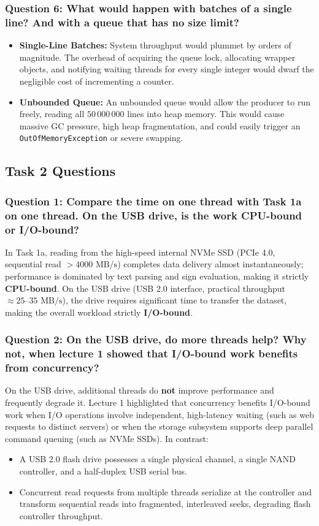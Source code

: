 \documentclass[12pt,a4paper]{article}
\begin{document}
\subsubsection{Question 6: What would happen with batches of a single line? And with a queue that has no size limit?}
\begin{itemize}
    \item \textbf{Single-Line Batches:} System throughput would plummet by orders of magnitude. The overhead of acquiring the queue lock, allocating wrapper objects, and notifying waiting threads for every single integer would dwarf the negligible cost of incrementing a counter.
    \item \textbf{Unbounded Queue:} An unbounded queue would allow the producer to run freely, reading all $50\,000\,000$ lines into heap memory. This would cause massive GC pressure, high heap fragmentation, and could easily trigger an \texttt{OutOfMemoryException} or severe swapping.
\end{itemize}

\subsection{Task 2 Questions}

\subsubsection{Question 1: Compare the time on one thread with Task 1a on one thread. On the USB drive, is the work CPU-bound or I/O-bound?}
In Task 1a, reading from the high-speed internal NVMe SSD (PCIe 4.0, sequential read $>4000\text{ MB/s}$) completes data delivery almost instantaneously; performance is dominated by text parsing and sign evaluation, making it strictly \textbf{CPU-bound}. On the USB drive (USB 2.0 interface, practical throughput $\approx 25\text{--}35\text{ MB/s}$), the drive requires significant time to transfer the dataset, making the overall workload strictly \textbf{I/O-bound}.

\subsubsection{Question 2: On the USB drive, do more threads help? Why not, when lecture 1 showed that I/O-bound work benefits from concurrency?}
On the USB drive, additional threads do \textbf{not} improve performance and frequently degrade it. Lecture 1 highlighted that concurrency benefits I/O-bound work when I/O operations involve independent, high-latency waiting (such as web requests to distinct servers) or when the storage subsystem supports deep parallel command queuing (such as NVMe SSDs). In contrast:
\begin{itemize}
    \item A USB 2.0 flash drive possesses a single physical channel, a single NAND controller, and a half-duplex USB serial bus.
    \item Concurrent read requests from multiple threads serialize at the controller and transform sequential reads into fragmented, interleaved seeks, degrading flash controller throughput.
\end{itemize}
\end{document}
